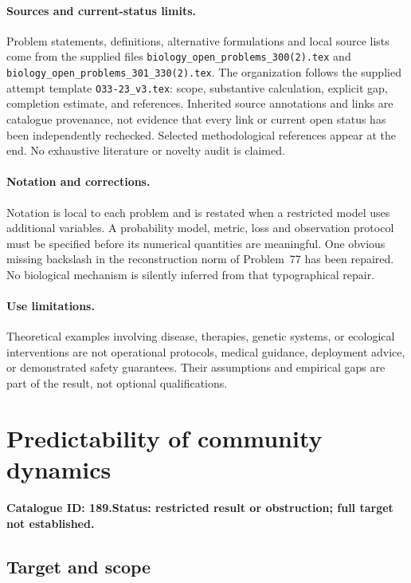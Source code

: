 \documentclass[11pt]{article}
\begin{document}
\paragraph{Sources and current-status limits.}
Problem statements, definitions, alternative formulations and local source lists
come from the supplied files
\texttt{biology\_open\_problems\_300(2).tex} and
\texttt{biology\_open\_problems\_301\_330(2).tex}.
The organization follows the supplied attempt template
\texttt{O33-23\_v3.tex}: scope, substantive calculation, explicit gap,
completion estimate, and references. Inherited source annotations and links are
catalogue provenance, not evidence that every link or current open status has
been independently rechecked. Selected methodological references appear at the
end. No exhaustive literature or novelty audit is claimed.

\paragraph{Notation and corrections.}
Notation is local to each problem and is restated when a restricted model uses
additional variables. A probability model, metric, loss and observation protocol
must be specified before its numerical quantities are meaningful. One obvious
missing backslash in the reconstruction norm of Problem~77 has been repaired.
No biological mechanism is silently inferred from that typographical repair.

\paragraph{Use limitations.}
Theoretical examples involving disease, therapies, genetic systems, or ecological
interventions are not operational protocols, medical guidance, deployment advice,
or demonstrated safety guarantees. Their assumptions and empirical gaps are part
of the result, not optional qualifications.

\setcounter{section}{188}
\section{Predictability of community dynamics}
\label{prob:189}
\noindent\textbf{Catalogue ID: 189.}\quad \textbf{Status: restricted result or obstruction; full target not established.}
\subsection{Target and scope}
\end{document}
